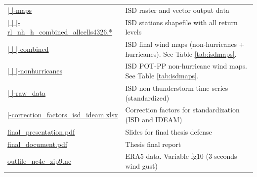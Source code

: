 \documentclass[12pt,twoside]{reedthesis}
\begin{document}
\begin{longtable}[t]{>{\raggedright\arraybackslash}p{2.2in}>{\raggedright\arraybackslash}p{4in}}
\href{ftp://ftp.geocorp.co/windthesis/potpp/isd/maps/}{  |    |-maps} & ISD raster and vector output data\\
\href{ftp://ftp.geocorp.co/windthesis/potpp/isd/maps/}{  |    |    |-rl\_nh\_h\_combined\_allcells4326.*} & ISD stations shapefile with all return levels\\
\href{ftp://ftp.geocorp.co/windthesis/potpp/isd/maps/combined/}{  |    |    |-combined} & ISD final wind maps (non-hurricanes + hurricanes). See Table \ref{tab:isdmaps}.\\
\href{ftp://ftp.geocorp.co/windthesis/potpp/isd/maps/nonhurricanes/}{  |    |    |-nonhurricanes} & ISD POT-PP non-hurricane wind maps. See Table \ref{tab:isdmaps}.\\
\href{ftp://ftp.geocorp.co/windthesis/potpp/isd/raw_data/}{  |    |-raw\_data} & ISD non-thunderstorm time series (standardized)\\
\href{ftp://ftp.geocorp.co/windthesis/potpp/correction_factors_isd_ideam.xlsx}{  |-correction\_factors\_isd\_ideam.xlsx} & Correction factors for standardization (ISD and IDEAM)\\
\href{ftp://ftp.geocorp.co/windthesis/final_presentation.pdf}{final\_presentation.pdf} & Slides for final thesis defense\\
\href{ftp://ftp.geocorp.co/windthesis/final_document.pdf}{final\_document.pdf} & Thesis final report\\
\href{ftp://ftp.geocorp.co/windthesis/outfile_nc4c_zip9.nc}{outfile\_nc4c\_zip9.nc} & ERA5 data. Variable fg10 (3-seconds wind gust)\\
\bottomrule
\end{longtable}
\endgroup{}
\end{document}
